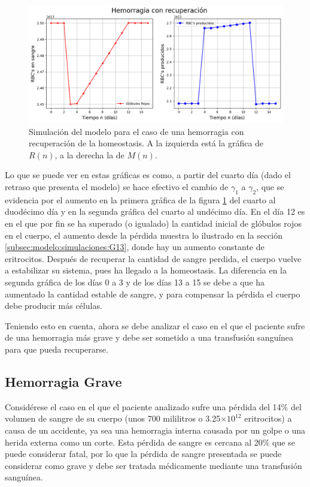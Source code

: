 \begin{figure}[H]
    \centering
    \captionsetup{justification=centering}
    \includegraphics[scale=0.534]{figures/HemoLeveG13.png}
    \caption{Simulación del modelo para el caso de una hemorragia con recuperación de la homeostasis. A la izquierda está la gráfica de $R(n)$, a la derecha la de $M(n)$.}
    \label{sec:variaciones:fig:HemoLeveG13}
\end{figure}

Lo que se puede ver en estas gráficas es como, a partir del cuarto día (dado el retraso que presenta el modelo) se hace efectivo el cambio de $\gamma_1$ a $\gamma_2$, que se evidencia por el aumento en la primera gráfica de la figura \ref{sec:variaciones:fig:HemoLeveG13} del cuarto al duodécimo día y en la segunda gráfica del cuarto al undécimo día. En el día 12 es en el que por fin se ha superado (o igualado) la cantidad inicial de glóbulos rojos en el cuerpo, el aumento desde la pérdida muestra lo ilustrado en la sección \ref{subsec:modelo:simulaciones:G13}, donde hay un aumento constante de eritrocitos. Después de recuperar la cantidad de sangre perdida, el cuerpo vuelve a estabilizar su sistema, pues ha llegado a la homeostasis. La diferencia en la segunda gráfica de los días 0 a 3 y de los días 13 a 15 se debe a que ha aumentado la cantidad estable de sangre, y para compensar la pérdida el cuerpo debe producir más células.

Teniendo esto en cuenta, ahora se debe analizar el caso en el que el paciente sufre de una hemorragia más grave y debe ser sometido a una transfusión sanguínea para que pueda recuperarse.

\subsection{Hemorragia Grave}

Considérese el caso en el que el paciente analizado sufre una pérdida del 14$\%$ del volumen de sangre de su cuerpo (unos 700 mililitros o 3.25$\times 10^{12}$ eritrocitos) a causa de un accidente, ya sea una hemorragia interna causada por un golpe o una herida externa como un corte. Esta pérdida de sangre es cercana al 20$\%$ que se puede considerar fatal, por lo que la pérdida de sangre presentada se puede considerar como grave y debe ser tratada médicamente mediante una transfusión sanguínea.

